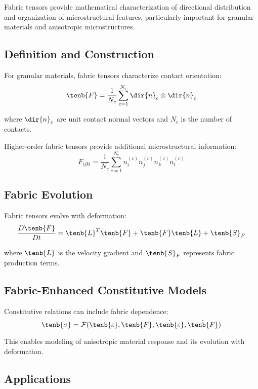 Fabric tensors provide mathematical characterization of directional distribution and organization of microstructural features, particularly important for granular materials and anisotropic microstructures.

\subsection{Definition and Construction}

For granular materials, fabric tensors characterize contact orientation:
\begin{equation}
\tenb{F} = \frac{1}{N_c} \sum_{c=1}^{N_c} \dir{n}_c \otimes \dir{n}_c
\end{equation}

where $\dir{n}_c$ are unit contact normal vectors and $N_c$ is the number of contacts.

Higher-order fabric tensors provide additional microstructural information:
\begin{equation}
F_{ijkl} = \frac{1}{N_c} \sum_{c=1}^{N_c} n_i^{(c)} n_j^{(c)} n_k^{(c)} n_l^{(c)}
\end{equation}

\subsection{Fabric Evolution}

Fabric tensors evolve with deformation:
\begin{equation}
\frac{D\tenb{F}}{Dt} = \tenb{L}^T \tenb{F} + \tenb{F} \tenb{L} + \tenb{S}_F
\end{equation}

where $\tenb{L}$ is the velocity gradient and $\tenb{S}_F$ represents fabric production terms.

\subsection{Fabric-Enhanced Constitutive Models}

Constitutive relations can include fabric dependence:
\begin{equation}
\tenb{\sigma} = \mathcal{F}(\tenb{\varepsilon}, \tenb{F}, \dot{\tenb{\varepsilon}}, \dot{\tenb{F}})
\end{equation}

This enables modeling of anisotropic material response and its evolution with deformation.

\subsection{Applications}

